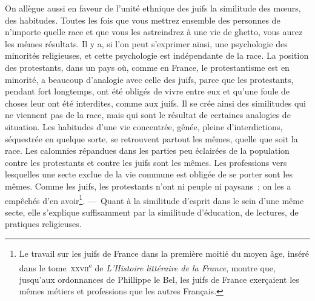 \documentclass[french,twoside]{book} %
\newcommand\orgName[1]{#1}
\newcommand\persName[1]{#1}
\newcommand\placeName[1]{#1}
\begin{document}
On allègue aussi en faveur de l’unité ethnique des {\orgName juifs} la similitude des mœurs, des habitudes. Toutes les fois que vous mettrez ensemble des personnes de n’importe quelle race et que vous les astreindrez à une vie de ghetto, vous aurez les mêmes résultats. Il y a, si l’on peut s’exprimer ainsi, une psychologie des minorités religieuses, et cette psychologie est indépendante de la race. La position des {\orgName protestants}, dans un pays où, comme en {\placeName France}, le protestantisme est en minorité, a beaucoup d’analogie avec celle des juifs, parce que les protestants, pendant fort longtemps, ont été obligés de vivre entre eux et qu’une foule de choses leur ont été interdites, comme aux juifs. Il se crée ainsi des similitudes qui ne viennent pas de la race, mais qui sont le résultat de certaines analogies de situation. Les habitudes d’une vie concentrée, gênée, pleine d’interdictions, séquestrée en quelque sorte, se retrouvent partout les mêmes, quelle que soit la race. Les calomnies répandues dans les parties peu éclairées de la population contre les {\orgName protestants} et contre les {\orgName juifs} sont les mêmes. Les professions vers lesquelles une secte exclue de la vie commune est obligée de se porter sont les mêmes. Comme les {\orgName juifs}, les {\orgName protestants} n’ont ni peuple ni paysans ; on les a empêchés d’en avoir\footnote{Le travail sur les {\orgName juifs de France} dans la première moitié du moyen âge, inséré dans le tome \textsc{xxvii}\textsuperscript{e} de \emph{L’Histoire littéraire de la France}, montre que, jusqu’aux ordonnances de {\persName Phillippe le Bel}, les {\orgName juifs de France} exerçaient les mêmes métiers et professions que les autres Français.}. — Quant à la similitude d’esprit dans le sein d’une même secte, elle s’explique suffisamment par la similitude d’éducation, de lectures, de pratiques religieuses.\par
\end{document}
